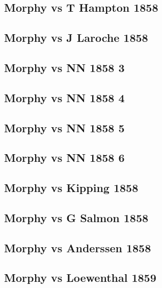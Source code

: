 \documentclass[]{book}
\begin{document}
\subsection{Morphy vs T Hampton 1858}\label{morphy-vs-t-hampton-1858}

\subsection{Morphy vs J Laroche 1858}\label{morphy-vs-j-laroche-1858}

\subsection{Morphy vs NN 1858 3}\label{morphy-vs-nn-1858-3}

\subsection{Morphy vs NN 1858 4}\label{morphy-vs-nn-1858-4}

\subsection{Morphy vs NN 1858 5}\label{morphy-vs-nn-1858-5}

\subsection{Morphy vs NN 1858 6}\label{morphy-vs-nn-1858-6}

\subsection{Morphy vs Kipping 1858}\label{morphy-vs-kipping-1858}

\subsection{Morphy vs G Salmon 1858}\label{morphy-vs-g-salmon-1858}

\subsection{Morphy vs Anderssen 1858}\label{morphy-vs-anderssen-1858}

\subsection{Morphy vs Loewenthal 1859}\label{morphy-vs-loewenthal-1859}
\end{document}
